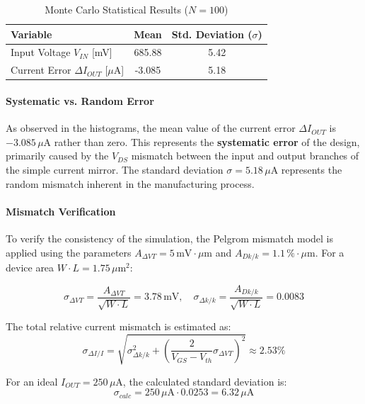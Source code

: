 \begin{table}[h!]
\centering
\caption{Monte Carlo Statistical Results ($N=100$)}
\label{table:monte_carlo}
\begin{tabular}{|l|c|c|}
\hline
\textbf{Variable} & \textbf{Mean} & \textbf{Std. Deviation ($\sigma$)} \\ \hline
Input Voltage $V_{IN}$ [mV]     & 685.88                & 5.42                               \\ \hline
Current Error $\Delta I_{OUT}$ [$\mu$A] & -3.085                   & 5.18                               \\ \hline
\end{tabular}
\label{Fig:table_montecarlo}
\end{table}
\paragraph{Systematic vs. Random Error}
As observed in the histograms, the mean value of the current error $\Delta I_{OUT}$ is $-3.085\,\mu$A rather than zero. This represents the \textbf{systematic error} of the design, primarily caused by the $V_{DS}$ mismatch between the input and output branches of the simple current mirror. The standard deviation $\sigma = 5.18\,\mu$A represents the random mismatch inherent in the manufacturing process.

\paragraph{Mismatch Verification}
To verify the consistency of the simulation, the Pelgrom mismatch model is applied using the parameters $A_{\Delta VT} = 5\,\text{mV}\cdot\mu\text{m}$ and $A_{Dk/k} = 1.1\,\%\cdot\mu\text{m}$. For a device area $W \cdot L = 1.75\,\mu\text{m}^2$:

\begin{equation*}
\sigma_{\Delta VT} = \frac{A_{\Delta VT}}{\sqrt{W \cdot L}} = 3.78\,\text{mV}, \quad \sigma_{\Delta k/k} = \frac{A_{Dk/k}}{\sqrt{W \cdot L}} = 0.0083
\end{equation*}

The total relative current mismatch is estimated as:
\begin{equation*}
\sigma_{\Delta I/I} = \sqrt{\sigma_{\Delta k/k}^2 + \left( \frac{2}{V_{GS} - V_{th}} \sigma_{\Delta VT} \right)^2} \approx 2.53\%
\end{equation*}

For an ideal $I_{OUT} = 250\,\mu$A, the calculated standard deviation is:
\begin{equation*}
\sigma_{calc} = 250\,\mu\text{A} \cdot 0.0253 = 6.32\,\mu\text{A}
\end{equation*}


